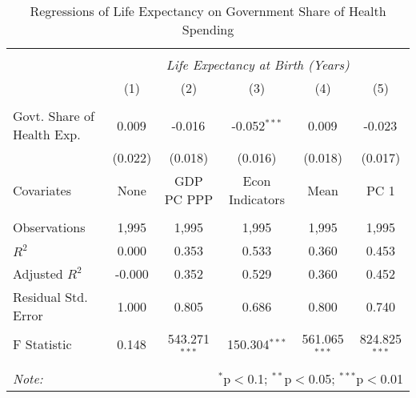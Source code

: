 \begin{table}[!htbp] \centering
  \caption{Regressions of Life Expectancy on Government Share of Health Spending \label{main_regs}}
\begin{tabular}{@{\extracolsep{5pt}}lccccc}
\\[-1.8ex]\hline
\hline \\[-1.8ex]
& \multicolumn{5}{c}{\textit{Life Expectancy at Birth (Years)}} \
\cr \
\\[-1.8ex] & (1) & (2) & (3) & (4) & (5) \\
\hline \\[-1.8ex]
 Govt. Share of Health Exp. & 0.009$^{}$ & -0.016$^{}$ & -0.052$^{***}$ & 0.009$^{}$ & -0.023$^{}$ \\
  & (0.022) & (0.018) & (0.016) & (0.018) & (0.017) \\
 Covariates & None & GDP PC PPP & Econ Indicators & Mean & PC 1 \\
\hline \\[-1.8ex]
 Observations & 1,995 & 1,995 & 1,995 & 1,995 & 1,995 \\
 $R^2$ & 0.000 & 0.353 & 0.533 & 0.360 & 0.453 \\
 Adjusted $R^2$ & -0.000 & 0.352 & 0.529 & 0.360 & 0.452 \\
 Residual Std. Error & 1.000 & 0.805 & 0.686 & 0.800 & 0.740  \\
 F Statistic & 0.148$^{}$  & 543.271$^{***}$  & 150.304$^{***}$  & 561.065$^{***}$  & 824.825$^{***}$  \\
\hline
\hline \\[-1.8ex]
\textit{Note:} & \multicolumn{5}{r}{$^{*}$p$<$0.1; $^{**}$p$<$0.05; $^{***}$p$<$0.01} \\
\end{tabular}
\end{table}